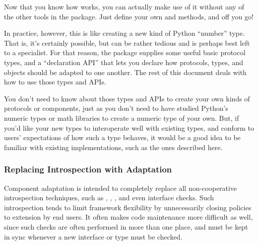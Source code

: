 Now that you know how  works, you can actually make use of it
without any of the other tools in the  package.  Just define
your own  and  methods, and off
you go!






In practice, however, this is like creating a new kind of Python ``number''
type.  That is, it's certainly possible, but can be rather tedious and is
perhaps best left to a specialist.  For that reason, the 
package supplies some useful basic protocol types, and a ``declaration API''
that lets you declare how protocols, types, and objects should be adapted to
one another.  The rest of this document deals with how to use those types and
APIs.

You don't need to know about those types and APIs to create your own kinds of
protocols or components, just as you don't need to have studied Python's
numeric types or math libraries to create a numeric type of your own.  But,
if you'd like your new types to interoperate well with existing types, and
conform to users' expectations of how such a type behaves, it would be a good
idea to be familiar with existing implementations, such as the ones described
here.


























\subsubsection{Replacing Introspection with Adaptation}

Component adaptation is intended to completely replace all non-cooperative
introspection techniques, such as , ,
, and even interface checks.  Such introspection
tends to limit framework flexibility by unnecessarily closing policies to
extension by end users.  It often makes code maintenance more difficult as
well, since such checks are often performed in more than one place, and
must be kept in sync whenever a new interface or type must be checked.

